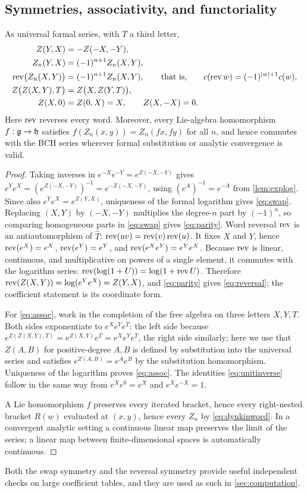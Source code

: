 \subsection{Symmetries, associativity, and functoriality}
\begin{proposition}\label{prop:symmetry}
As universal formal series, with $T$ a third letter,
\begin{align}
 Z(Y,X)&=-Z(-X,-Y),\label{eq:swap}\\
 Z_n(Y,X)&=(-1)^{n+1}Z_n(X,Y),\label{eq:parity}\\
 \operatorname{rev}\bigl(Z_n(X,Y)\bigr)&=(-1)^{n+1}Z_n(X,Y),
 \qquad\text{that is,}\qquad c(\operatorname{rev} w)=(-1)^{|w|+1}c(w),\label{eq:reversal}\\
 Z\bigl(Z(X,Y),T\bigr)&=Z\bigl(X,Z(Y,T)\bigr),\label{eq:assoc}\\
 Z(X,0)&=Z(0,X)=X,\qquad Z(X,-X)=0.\label{eq:unitinverse}
\end{align}
Here $\operatorname{rev}$ reverses every word. Moreover, every Lie-algebra homomorphism
$f:\mathfrak{g}\to\mathfrak{h}$ satisfies $f(Z_n(x,y))=Z_n(fx,fy)$ for all $n$, and hence
commutes with the BCH series wherever formal substitution or analytic
convergence is valid.
\end{proposition}
\begin{proof}
Taking inverses in $e^{-X}e^{-Y}=e^{Z(-X,-Y)}$ gives
$e^Ye^X=(e^{Z(-X,-Y)})^{-1}=e^{-Z(-X,-Y)}$, using $(e^A)^{-1}=e^{-A}$ from
\cref{lem:explog}. Since also $e^Ye^X=e^{Z(Y,X)}$, uniqueness of the formal
logarithm gives \eqref{eq:swap}. Replacing $(X,Y)$ by $(-X,-Y)$ multiplies
the degree-$n$ part by $(-1)^n$, so comparing homogeneous parts in
\eqref{eq:swap} gives \eqref{eq:parity}. Word reversal $\operatorname{rev}$ is an
antiautomorphism of $\widehat T$: $\operatorname{rev}(uv)=\operatorname{rev}(v)\operatorname{rev}(u)$. It fixes $X$
and $Y$, hence $\operatorname{rev}(e^X)=e^X$, $\operatorname{rev}(e^Y)=e^Y$, and
$\operatorname{rev}(e^Xe^Y)=e^Ye^X$. Because $\operatorname{rev}$ is linear, continuous, and
multiplicative on powers of a single element, it commutes with the
logarithm series: $\operatorname{rev}(\log(1+U))=\log(1+\operatorname{rev} U)$. Therefore
$\operatorname{rev}(Z(X,Y))=\log(e^Ye^X)=Z(Y,X)$, and \eqref{eq:parity} gives
\eqref{eq:reversal}; the coefficient statement is its coordinate form.

For \eqref{eq:assoc}, work in the completion of the free algebra on three
letters $X,Y,T$. Both sides exponentiate to $e^Xe^Ye^T$: the left side
because $e^{Z(Z(X,Y),T)}=e^{Z(X,Y)}e^T=e^Xe^Ye^T$, the right side
similarly; here we use that $Z(A,B)$ for positive-degree $A,B$ is defined
by substitution into the universal series and satisfies $e^{Z(A,B)}=e^Ae^B$
by the substitution homomorphism. Uniqueness of the logarithm proves
\eqref{eq:assoc}. The identities \eqref{eq:unitinverse} follow in the same
way from $e^Xe^0=e^X$ and $e^Xe^{-X}=1$.

A Lie homomorphism $f$ preserves every iterated bracket, hence every
right-nested bracket $R(w)$ evaluated at $(x,y)$, hence every $Z_n$ by
\eqref{eq:dynkinword}. In a convergent analytic setting a continuous linear
map preserves the limit of the series; a linear map between
finite-dimensional spaces is automatically continuous.
\end{proof}
Both the swap symmetry and the reversal symmetry provide useful independent
checks on large coefficient tables, and they are used as such in
\cref{sec:computation}.


